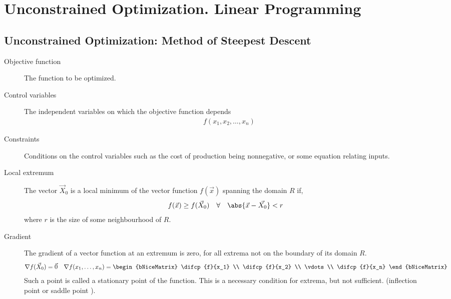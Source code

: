 \chapter{Unconstrained Optimization. Linear Programming}

\section{Unconstrained Optimization: Method of Steepest Descent}

\begin{description}
    \item[Objective function] The function to be optimized.
    \item[Control variables] The independent variables on which the objective function
        depends
        \begin{align}
            f(x_1,x_2,\dots,x_n)
        \end{align}
    \item[Constraints] Conditions on the control variables such as the cost of production
        being nonnegative, or some equation relating inputs.

    \item[Local extremum] The vector $ \vec{X}_0 $ is a local minimum of the vector
        function $ f(\vec{x}) $ spanning the domain $ R $ if,
        \begin{align}
            f(\vec{x})                              & \geq f(\vec{X}_0) &
            \forall \quad \abs{\vec{x} - \vec{X_0}} & < r
        \end{align}
        where $ r $ is the size of some neighbourhood of $ R $.

    \item[Gradient] The gradient of a vector function at an extremum is zero, for all
        extrema not on the boundary of its domain $ R $.
        \begin{align}
            \nabla f (\vec{X}_0)    & = \vec{0} &
            \nabla f(x_1,\dots,x_n) & =
            \begin{bNiceMatrix}
                \difcp {f}{x_1} \\ \difcp {f}{x_2} \\ \vdots \\ \difcp {f}{x_n}
            \end{bNiceMatrix}
        \end{align}
        Such a point is called a stationary point of the function. This is a necessary
        condition for extrema, but not sufficient. (inflection point or saddle point
        ).


\end{description}
